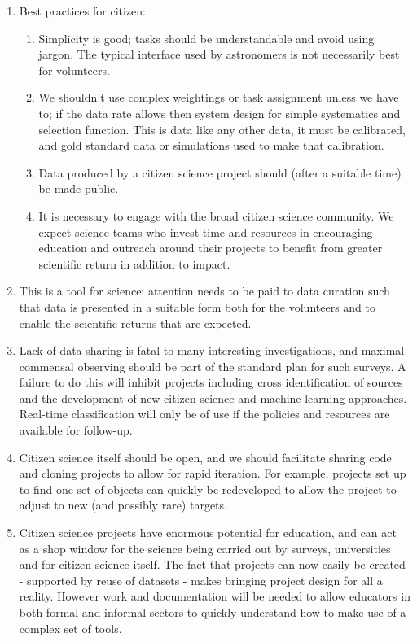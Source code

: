 \documentclass{pasa}
\begin{document}
\begin{enumerate}
\item Best practices for citizen: 
\begin{enumerate}
\item Simplicity is good; tasks should be understandable and avoid using jargon. The typical interface used by astronomers is not necessarily best for volunteers. 
\item We shouldn't use complex weightings or task assignment unless we have to; if the data rate allows then system design for simple systematics and selection function. This is data like any other data, it must be calibrated, and gold standard data or simulations used to make that calibration.
\item Data produced by a citizen science project should (after a suitable time) be made public. 
\item It is necessary to engage with the broad citizen science community. We expect science teams who invest time and resources in encouraging education and outreach around their projects to benefit from greater scientific return in addition to impact. 
\end{enumerate}

\item This is a tool for science; attention needs to be paid to data curation such that data is presented in a suitable form both for the volunteers and to enable the scientific returns that are expected. 
	
\item Lack of data sharing is fatal to many interesting investigations, and maximal commensal observing should be part of the standard plan for such surveys. A failure to do this will inhibit projects including cross identification of sources and the development of new citizen science and machine learning approaches. Real-time classification will only be of use if the policies and resources are available for follow-up. 

\item Citizen science itself should be open, and we should facilitate sharing code and cloning projects to allow for rapid iteration. For example, projects set up to find one set of objects can quickly be redeveloped to allow the project to adjust to new (and possibly rare) targets.

\item Citizen science projects have enormous potential for education, and can act as a shop window for the science being carried out by surveys, universities and for citizen science itself. The fact that projects can now easily be created - supported by reuse of datasets - makes bringing project design for all a reality. However work and documentation will be needed to allow educators in both formal and informal sectors to quickly understand how to make use of a complex set of tools. 

\end{enumerate} 
\end{document}
